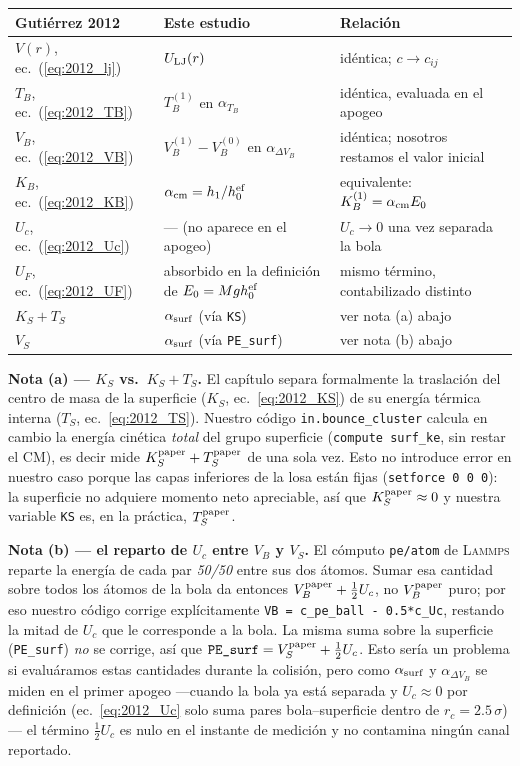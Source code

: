 \documentclass[11pt,a4paper]{article}
\newcommand{\lammps}{\textsc{Lammps}}
\begin{document}
\begin{center}
\begin{tabular}{lll}
\toprule
Gutiérrez 2012 & Este estudio & Relación \\
\midrule
$V(r)$, ec.~(\ref{eq:2012_lj}) & $U_{\rm LJ}(r)$ & idéntica; $c\to c_{ij}$ \\
$T_B$, ec.~(\ref{eq:2012_TB}) & $T_B^{(1)}$ en $\alpha_{T_B}$ & idéntica, evaluada en el apogeo \\
$V_B$, ec.~(\ref{eq:2012_VB}) & $V_B^{(1)}-V_B^{(0)}$ en $\alpha_{\Delta V_B}$ & idéntica; nosotros restamos el valor inicial \\
$K_B$, ec.~(\ref{eq:2012_KB}) & $\alpha_{\rm cm}=h_1/h_0^{\rm ef}$ & equivalente: $K_B^{(1)}=\alpha_{\rm cm}E_0$ \\
$U_c$, ec.~(\ref{eq:2012_Uc}) & --- (no aparece en el apogeo) & $U_c\to0$ una vez separada la bola \\
$U_F$, ec.~(\ref{eq:2012_UF}) & absorbido en la definición de $E_0=Mg h_0^{\rm ef}$ & mismo término, contabilizado distinto \\
$K_S+T_S$ & $\alpha_{\rm surf}$ (vía \texttt{KS}) & ver nota (a) abajo \\
$V_S$ & $\alpha_{\rm surf}$ (vía \texttt{PE\_surf}) & ver nota (b) abajo \\
\bottomrule
\end{tabular}
\end{center}

\textbf{Nota (a) --- $K_S$ vs.\ $K_S+T_S$.} El capítulo separa
formalmente la traslación del centro de masa de la superficie ($K_S$,
ec.~\ref{eq:2012_KS}) de su energía térmica interna ($T_S$,
ec.~\ref{eq:2012_TS}). Nuestro código \texttt{in.bounce\_cluster} calcula
en cambio la energía cinética \emph{total} del grupo superficie
(\texttt{compute surf\_ke}, sin restar el CM), es decir mide
$K_S^{\rm paper}+T_S^{\rm paper}$ de una sola vez. Esto no introduce error
en nuestro caso porque las capas inferiores de la losa están fijas
(\texttt{setforce~0~0~0}): la superficie no adquiere momento neto
apreciable, así que $K_S^{\rm paper}\approx0$ y nuestra variable
\texttt{KS} es, en la práctica, $T_S^{\rm paper}$.

\textbf{Nota (b) --- el reparto de $U_c$ entre $V_B$ y $V_S$.} El cómputo
\texttt{pe/atom} de \lammps{} reparte la energía de cada par
\emph{50/50} entre sus dos átomos. Sumar esa cantidad sobre todos los
átomos de la bola da entonces $V_B^{\rm paper}+\tfrac12 U_c$, no
$V_B^{\rm paper}$ puro; por eso nuestro código corrige explícitamente
\verb|VB = c_pe_ball - 0.5*c_Uc|, restando la mitad de $U_c$ que le
corresponde a la bola. La misma suma sobre la superficie
(\texttt{PE\_surf}) \emph{no} se corrige, así que
$\texttt{PE\_surf}=V_S^{\rm paper}+\tfrac12 U_c$. Esto sería un problema
si evaluáramos estas cantidades durante la colisión, pero como
$\alpha_{\rm surf}$ y $\alpha_{\Delta V_B}$ se miden en el primer apogeo
---cuando la bola ya está separada y $U_c\approx0$ por definición
(ec.~\ref{eq:2012_Uc} solo suma pares bola--superficie dentro de
$r_c=2.5\,\sigma$)--- el término $\tfrac12 U_c$ es nulo en el instante de
medición y no contamina ningún canal reportado.
\end{document}
